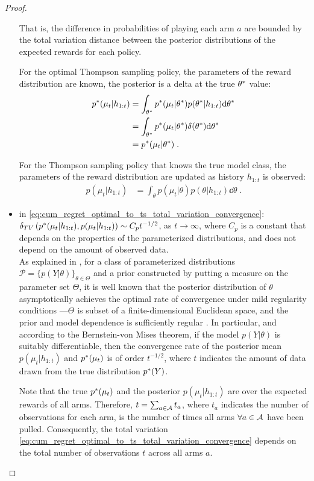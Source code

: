 \begin{proof}
\begin{itemize}
	That is, the difference in probabilities of playing each arm $a$ are bounded by the total variation distance between the posterior distributions of the expected rewards for each policy.
	
	For the optimal Thompson sampling policy, the parameters of the reward distribution are known, \ie the posterior is a delta at the true $\theta^*$ value:
	\begin{align}
		p^*(\mu_t|h_{1:t}) &=\int_{\theta^*}p^*(\mu_t|\theta^*)p(\theta^*|h_{1:t})\mathrm{d} \theta^* \nonumber \\
		&=\int_{\theta^*}p^*(\mu_t|\theta^*)\delta(\theta^*)\mathrm{d} \theta^* \nonumber \\ 
		&= p^*(\mu_t|\theta^*) \nonumber \;.
	\end{align}
	
	For the Thompson sampling policy that knows the true model class, the parameters of the reward distribution are updated as history $h_{1:t}$ is observed:
	\begin{align}
	p(\mu_t|h_{1:t}) &=\int_{\theta} p(\mu_t|\theta)p(\theta|h_{1:t})\dd\theta \nonumber \;.
	\end{align}
	
	\item in \autoref{eq:cum_regret_optimal_to_ts_total_variation_convergence}: $\delta_{TV} \left(p^*(\mu_t|h_{1:t}),p(\mu_t|h_{1:t})\right) \sim C_p t^{-1/2}$, as $t \rightarrow \infty$, where $C_p$ is a constant that depends on the properties of the parameterized distributions, and does not depend on the amount of observed data. \\
	As explained in \citep{j-Ghosal2000}, for a class of parameterized distributions $\mathcal{P}=\{p(Y|\theta)\}_{\theta \in \Theta}$ and a prior constructed by putting a measure on the parameter set $\Theta$, it is well known that the posterior distribution of $\theta$ asymptotically achieves the optimal rate of convergence under mild regularity conditions ---\ie $\Theta$ is subset of a finite-dimensional Euclidean space, and the prior and model dependence is sufficiently regular \citep{b-Ibragimov1981}.
	In particular, and according to the Bernstein-von Mises theorem, if the model $p(Y|\theta)$ is suitably differentiable, then the convergence rate of the posterior mean $p(\mu_t|h_{1:t})$ and $p^*(\mu_t)$ is of order $t^{-1/2}$, where $t$ indicates the amount of \iid data drawn from the true distribution $p^*(Y)$.
	
	Note that the true $p^*(\mu_t)$ and the posterior $p(\mu_t|h_{1:t})$ are over the expected rewards of all arms.
	Therefore, $t=\sum_{a \in \mathcal{A}} t_a$, where $t_a$ indicates the number of observations for each arm, is the number of times all arms $\forall a\in \mathcal{A}$ have been pulled.
	Consequently, the total variation \autoref{eq:cum_regret_optimal_to_ts_total_variation_convergence} depends on the total number of observations $t$ across all arms $a$.
	

\end{itemize}
\end{proof}
